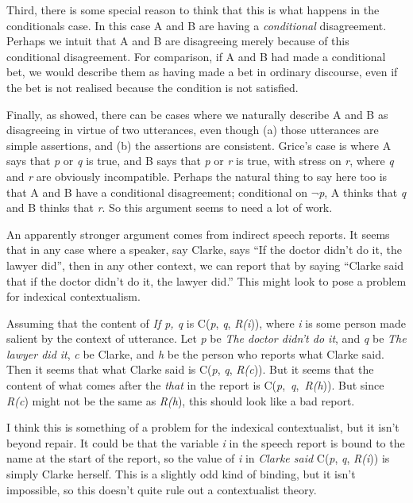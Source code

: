 Third, there is some special reason to think that this is what happens in the conditionals case. In this case A and B are having a \textit{conditional} disagreement. Perhaps we intuit that A and B are disagreeing merely because of this conditional disagreement. For comparison, if A and B had made a conditional bet, we would describe them as having made a bet in ordinary discourse, even if the bet is not realised because the condition is not satisfied.

Finally, as \cite{Grice1989} showed, there can be cases where we naturally describe A and B as disagreeing in virtue of two utterances, even though (a) those utterances are simple assertions, and (b) the assertions are consistent. Grice's case is where A says that \textit{p} or \textit{q} is true, and B says that \textit{p} or \textit{r} is true, with stress on \textit{r}, where \textit{q} and \textit{r} are obviously incompatible. Perhaps the natural thing to say here too is that A and B have a conditional disagreement; conditional on \(\neg\){}\textit{p}, A thinks that \textit{q} and B thinks that \textit{r}. So this argument seems to need a lot of work.

An apparently stronger argument comes from indirect speech reports. It seems that in any case where a speaker, say Clarke, says ``If the doctor didn't do it, the lawyer did'', then in any other context, we can report that by saying ``Clarke said that if the doctor didn't do it, the lawyer did.'' This might look to pose a problem for indexical contextualism.

Assuming that the content of \textit{If p, q} is C(\textit{p}, \textit{q}, \textit{R(i})), where \textit{i} is some person made salient by the context of utterance. Let \textit{p} be \textit{The doctor didn't do it}, and \textit{q} be \textit{The lawyer did it}, \textit{c} be Clarke, and \textit{h} be the person who reports what Clarke said. Then it seems that what Clarke said is C(\textit{p}, \textit{q}, \textit{R(c})). But it seems that the content of what comes after the \textit{that} in the report is C(\textit{p},~\textit{q},~\textit{R(h})). But since \textit{R(c}) might not be the same as \textit{R(h}), this should look like a bad report.

I think this is something of a problem for the indexical contextualist, but it isn't beyond repair. It could be that the variable \textit{i} in the speech report is bound to the name at the start of the report, so the value of \textit{i} in \textit{Clarke said }C(\textit{p}, \textit{q}, \textit{R(i})) is simply Clarke herself. This is a slightly odd kind of binding, but it isn't impossible, so this doesn't quite rule out a contextualist theory.

